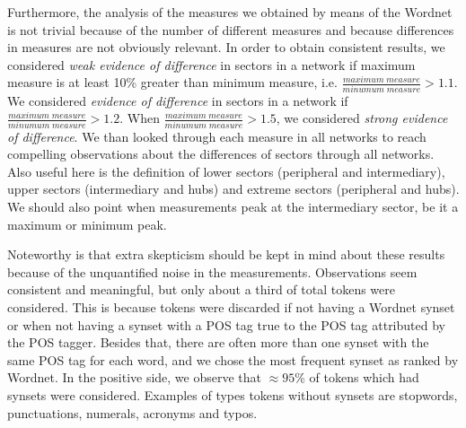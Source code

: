 																																																Furthermore, the analysis of the measures we obtained by means of the Wordnet
																																																is not trivial because of the number of different measures
																																																and because differences in measures are not obviously relevant.
																																																In order to obtain consistent results, we considered \emph{weak evidence of difference} in sectors in a network
																																																if maximum measure is at least 10\% greater than minimum measure,
																																																i.e. $\frac{maximum\;measure}{minumum\;measure}>1.1$.
																																																We considered \emph{evidence of difference} in sectors in a network if
																																																$\frac{maximum\;measure}{minumum\;measure}>1.2$.
																																																When 
																																																$\frac{maximum\;measure}{minumum\;measure}>1.5$, we considered \emph{strong evidence of difference}.
																																																We than looked through each measure in all networks to reach compelling observations about the
																																																differences of sectors through all networks.
																																																Also useful here is the definition of lower sectors (peripheral and intermediary),
																																																upper sectors (intermediary and hubs) and extreme sectors (peripheral and hubs).
																																																We should also point when measurements peak at the intermediary sector,
																																																be it a maximum or minimum peak.

																																																Noteworthy is that extra skepticism should be kept in mind about these results
																																																because of the unquantified noise in the measurements.
																																																Observations seem consistent and meaningful, but only about a third of total tokens
																																																were considered.
																																																This is because tokens were discarded if not having a Wordnet synset
																																																or when not having a synset with a POS tag true to the POS tag attributed by the POS tagger.
																																																Besides that, there are often more than one synset with the same POS tag for each word,
																																																and we chose the most frequent synset as ranked by Wordnet.
																																																In the positive side, we observe that $\approx 95\%$ of tokens which had synsets
																																																were considered.
																																																Examples of types tokens without synsets are stopwords, punctuations, numerals, acronyms and typos.

